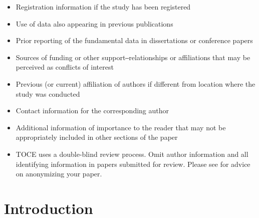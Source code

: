 \documentclass[acmsmall]{acmart}
\begin{document}
\begin{itemize}
    \item Registration information if the study has been registered
    \item Use of data also appearing in previous publications
    \item Prior reporting of the fundamental data in dissertations or conference papers
    \item Sources of funding or other support‒relationships or affiliations that may be perceived as conflicts of interest
    \item Previous (or current) affiliation of authors if different from location where the study  was conducted
    \item Contact information for the corresponding author
    \item Additional information of importance to the reader that may not be appropriately included in other sections of the paper
    \item TOCE uses a double-blind review process. Omit author information and all identifying information in papers submitted for review. Please see \hyperlink{https://dl.acm.org/journal/toce/author-guidelines}{\color{blue}{TOCE’s Author Guidelines page}} for advice on anonymizing your paper.
\end{itemize}


\section{Introduction}
\end{document}
